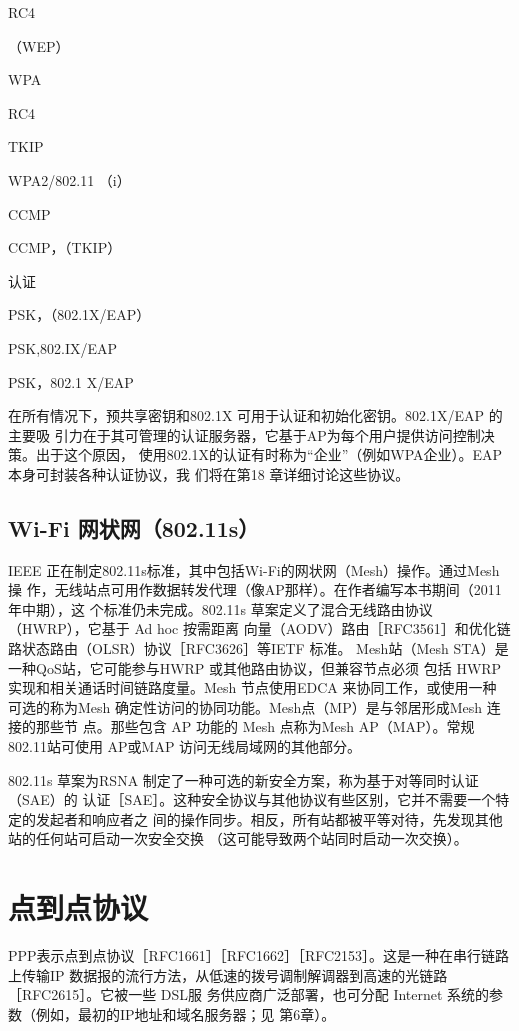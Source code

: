RC4

（WEP）

WPA

RC4

TKIP

WPA2/802.11 （i）

CCMP

CCMP，（TKIP）

认证

PSK，（802.1X/EAP）

PSK,802.IX/EAP

PSK，802.1 X/EAP

在所有情况下，预共享密钥和802.1X 可用于认证和初始化密钥。802.1X/EAP 的主要吸
引力在于其可管理的认证服务器，它基于AP为每个用户提供访问控制决策。出于这个原因，
使用802.1X的认证有时称为“企业”（例如WPA企业）。EAP本身可封装各种认证协议，我
们将在第18 章详细讨论这些协议。

\subsection{Wi-Fi 网状网（802.11s）}

IEEE 正在制定802.11s标准，其中包括Wi-Fi的网状网（Mesh）操作。通过Mesh 操
作，无线站点可用作数据转发代理（像AP那样）。在作者编写本书期间（2011年中期），这
个标准仍未完成。802.11s 草案定义了混合无线路由协议（HWRP），它基于 Ad hoc 按需距离
向量（AODV）路由［RFC3561］和优化链路状态路由（OLSR）协议［RFC3626］等IETF 标准。
Mesh站（Mesh STA）是一种QoS站，它可能参与HWRP 或其他路由协议，但兼容节点必须
包括 HWRP实现和相关通话时间链路度量。Mesh 节点使用EDCA 来协同工作，或使用一种
可选的称为Mesh 确定性访问的协同功能。Mesh点（MP）是与邻居形成Mesh 连接的那些节
点。那些包含 AP 功能的 Mesh 点称为Mesh AP（MAP）。常规802.11站可使用 AP或MAP
访问无线局域网的其他部分。

802.11s 草案为RSNA 制定了一种可选的新安全方案，称为基于对等同时认证（SAE）的
认证［SAE］。这种安全协议与其他协议有些区别，它并不需要一个特定的发起者和响应者之
间的操作同步。相反，所有站都被平等对待，先发现其他站的任何站可启动一次安全交换
（这可能导致两个站同时启动一次交换）。

\section{点到点协议}

PPP表示点到点协议［RFC1661］［RFC1662］［RFC2153］。这是一种在串行链路上传输IP
数据报的流行方法，从低速的拨号调制解调器到高速的光链路［RFC2615］。它被一些 DSL服
务供应商广泛部署，也可分配 Internet 系统的参数（例如，最初的IP地址和域名服务器；见
第6章）。

